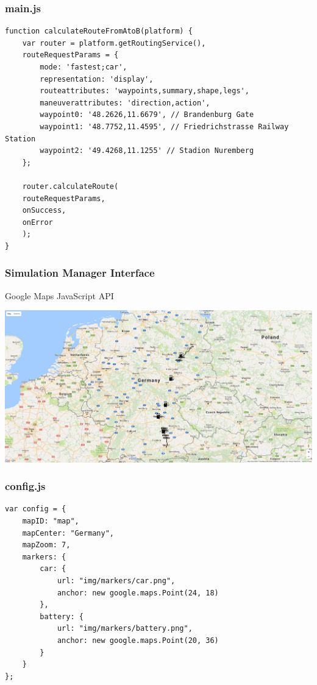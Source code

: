 \begin{frame}[fragile]
\frametitle{main.js}

\begin{verbatim}
function calculateRouteFromAtoB(platform) {
    var router = platform.getRoutingService(),
    routeRequestParams = {
        mode: 'fastest;car',
        representation: 'display',
        routeattributes: 'waypoints,summary,shape,legs',
        maneuverattributes: 'direction,action',
        waypoint0: '48.2626,11.6679', // Brandenburg Gate
        waypoint1: '48.7752,11.4595', // Friedrichstrasse Railway Station
        waypoint2: '49.4268,11.1255' // Stadion Nuremberg
    };

    router.calculateRoute(
    routeRequestParams,
    onSuccess,
    onError
    );
}
\end{verbatim}

\end{frame}
\clearpage



\begin{frame}
\frametitle{Simulation Manager Interface}

Google Maps JavaScript API \\

\vspace*{-3mm}
\begin{minipage}[t][0cm]{\paperwidth}%
\hspace*{-\PraesentationSeitenrand}%
\includegraphics[width=\paperwidth]{images/simulation_manager.png}
\end{minipage}

\end{frame}
\clearpage



\begin{frame}[fragile]
\frametitle{config.js}

\begin{verbatim}
var config = {
    mapID: "map",
    mapCenter: "Germany",
    mapZoom: 7,
    markers: {
        car: {
            url: "img/markers/car.png",
            anchor: new google.maps.Point(24, 18)
        },
        battery: {
            url: "img/markers/battery.png",
            anchor: new google.maps.Point(20, 36)
        }
    }
};
\end{verbatim}

\end{frame}
\clearpage



